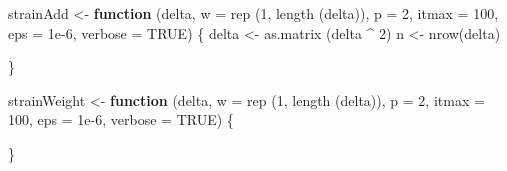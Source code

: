 \documentclass[
  12pt,
  letterpaper,
  DIV=11,
  numbers=noendperiod]{scrreprt}
\newenvironment{Shaded}{\begin{snugshade}}{\end{snugshade}}
\newcommand{\AttributeTok}[1]{\textcolor[rgb]{0.40,0.45,0.13}{#1}}
\newcommand{\ConstantTok}[1]{\textcolor[rgb]{0.56,0.35,0.01}{#1}}
\newcommand{\ControlFlowTok}[1]{\textcolor[rgb]{0.00,0.23,0.31}{\textbf{#1}}}
\newcommand{\DecValTok}[1]{\textcolor[rgb]{0.68,0.00,0.00}{#1}}
\newcommand{\FloatTok}[1]{\textcolor[rgb]{0.68,0.00,0.00}{#1}}
\newcommand{\FunctionTok}[1]{\textcolor[rgb]{0.28,0.35,0.67}{#1}}
\newcommand{\NormalTok}[1]{\textcolor[rgb]{0.00,0.23,0.31}{#1}}
\newcommand{\OtherTok}[1]{\textcolor[rgb]{0.00,0.23,0.31}{#1}}
\newcommand{\SpecialCharTok}[1]{\textcolor[rgb]{0.37,0.37,0.37}{#1}}
\theoremstyle{remark}
\begin{document}
\begin{Shaded}
\begin{Highlighting}[]
\NormalTok{strainAdd }\OtherTok{\textless{}{-}}
  \ControlFlowTok{function}\NormalTok{ (delta,}
            \AttributeTok{w =} \FunctionTok{rep}\NormalTok{ (}\DecValTok{1}\NormalTok{, }\FunctionTok{length}\NormalTok{ (delta)),}
            \AttributeTok{p =} \DecValTok{2}\NormalTok{,}
            \AttributeTok{itmax =} \DecValTok{100}\NormalTok{,}
            \AttributeTok{eps =} \FloatTok{1e{-}6}\NormalTok{,}
            \AttributeTok{verbose =} \ConstantTok{TRUE}\NormalTok{) \{}
\NormalTok{    delta }\OtherTok{\textless{}{-}} \FunctionTok{as.matrix}\NormalTok{ (delta }\SpecialCharTok{\^{}} \DecValTok{2}\NormalTok{)}
\NormalTok{    n }\OtherTok{\textless{}{-}} \FunctionTok{nrow}\NormalTok{(delta)}
    
\NormalTok{  \}}

\NormalTok{strainWeight }\OtherTok{\textless{}{-}}
  \ControlFlowTok{function}\NormalTok{ (delta,}
            \AttributeTok{w =} \FunctionTok{rep}\NormalTok{ (}\DecValTok{1}\NormalTok{, }\FunctionTok{length}\NormalTok{ (delta)),}
            \AttributeTok{p =} \DecValTok{2}\NormalTok{,}
            \AttributeTok{itmax =} \DecValTok{100}\NormalTok{,}
            \AttributeTok{eps =} \FloatTok{1e{-}6}\NormalTok{,}
            \AttributeTok{verbose =} \ConstantTok{TRUE}\NormalTok{) \{}
    
\NormalTok{  \}}


\end{Highlighting}
\end{Shaded}
\end{document}
